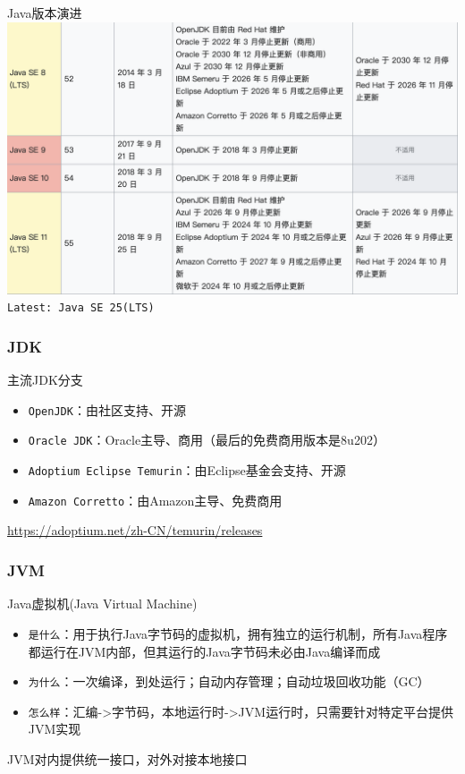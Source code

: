 \documentclass[UTF8, 16pt]{beamer}
\begin{document}
\begin{frame}
    \centering
    \textcolor{sufered}{Java版本演进}
    \includegraphics[width=0.95\linewidth]{ch1/edition.png}
    \texttt{Latest: Java SE 25(LTS)}
\end{frame}

\begin{frame}
    \frametitle{JDK}
    \textcolor{sufered}{主流JDK分支}

    \begin{itemize}
        \item \texttt{OpenJDK}：由社区支持、开源
        \item \texttt{Oracle JDK}：Oracle主导、商用（最后的免费商用版本是8u202）
        \item \texttt{Adoptium Eclipse Temurin}：由Eclipse基金会支持、开源
        \item \texttt{Amazon Corretto}：由Amazon主导、免费商用
    \end{itemize}

    \url{https://adoptium.net/zh-CN/temurin/releases}
\end{frame}

\begin{frame}[fragile]
    \frametitle{JVM}
    \textcolor{sufered}{Java虚拟机(Java Virtual Machine)}
    \begin{itemize}
        \item \texttt{是什么}：用于执行Java字节码的虚拟机，拥有独立的运行机制，所有Java程序都运行在JVM内部，但其运行的Java字节码未必由Java编译而成
        \item \texttt{为什么}：一次编译，到处运行；自动内存管理；自动垃圾回收功能（GC）
        \item \texttt{怎么样}：汇编->字节码，本地运行时->JVM运行时，只需要针对特定平台提供JVM实现
    \end{itemize}

    \textcolor{sufered}{JVM对内提供统一接口，对外对接本地接口}
\end{frame}
\end{document}
